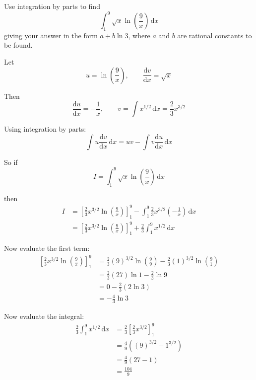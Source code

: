 \documentclass[leqno]{article}
\begin{document}
\djsFrontMatter
\begin{enumerate}[
  label=\textbf{\arabic*.},
  leftmargin=*,
  topsep=0pt,
  partopsep=0pt,
  parsep=0pt
]

\questionitem

Use integration by parts to find
\[
\int_1^9 \sqrt{x}\ln\left(\frac{9}{x}\right)\,\mathrm{d}x
\]
giving your answer in the form $a + b\ln 3$, where $a$ and $b$ are rational constants to be found. 

\vspace*{10pt}

\begin{djsSolution}
 Let
\[
u=\ln\left(\frac{9}{x}\right), \qquad \frac{\mathrm{d}v}{\mathrm{d}x}=\sqrt{x}
\]

Then
\[
\frac{\mathrm{d}u}{\mathrm{d}x}=-\frac{1}{x}, \qquad v=\int x^{1/2}\,\mathrm{d}x=\frac{2}{3}x^{3/2}
\]

Using integration by parts:
\[
\int u\frac{\mathrm{d}v}{\mathrm{d}x}\,\mathrm{d}x = uv - \int v\frac{\mathrm{d}u}{\mathrm{d}x}\,\mathrm{d}x
\]

So if
\[
I=\int_1^9 \sqrt{x}\ln\left(\frac{9}{x}\right)\,\mathrm{d}x
\]

then
\begin{align*}
I&=\left[\frac{2}{3}x^{3/2}\ln\left(\frac{9}{x}\right)\right]_1^9
-\int_1^9 \frac{2}{3}x^{3/2}\left(-\frac{1}{x}\right)\,\mathrm{d}x\\
&=\left[\frac{2}{3}x^{3/2}\ln\left(\frac{9}{x}\right)\right]_1^9
+\frac{2}{3}\int_1^9 x^{1/2}\,\mathrm{d}x
\end{align*}

Now evaluate the first term:
\begin{align*}
\left[\frac{2}{3}x^{3/2}\ln\left(\frac{9}{x}\right)\right]_1^9
&=\frac{2}{3}(9)^{3/2}\ln\left(\frac{9}{9}\right)-\frac{2}{3}(1)^{3/2}\ln\left(\frac{9}{1}\right)\\
&=\frac{2}{3}(27)\ln 1-\frac{2}{3}\ln 9\\
&=0-\frac{2}{3}(2\ln 3)\\
&=-\frac{4}{3}\ln 3
\end{align*}

Now evaluate the integral:
\begin{align*}
\frac{2}{3}\int_1^9 x^{1/2}\,\mathrm{d}x
&=\frac{2}{3}\left[\frac{2}{3}x^{3/2}\right]_1^9\\
&=\frac{4}{9}\left((9)^{3/2}-1^{3/2}\right)\\
&=\frac{4}{9}(27-1)\\
&=\frac{104}{9}
\end{align*}


\end{djsSolution}
\end{enumerate}
\end{document}
